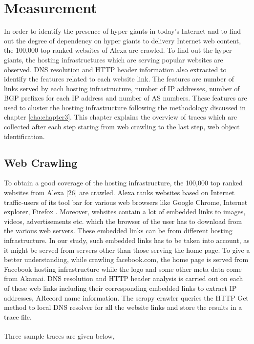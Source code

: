 \section{Measurement\label{cha:chapter5}}
\noindent In order to identify the presence of hyper giants in today's Internet and to find out the degree of dependency on hyper giants to delivery Internet web content, the 100,000 top ranked websites of Alexa are crawled. To find out the hyper giants, the hosting infrastructures which are serving popular websites are observed. DNS resolution and HTTP header information also extracted to identify the features related to each website link. The features are number of links served by each hosting infrastructure, number of IP addresses, number of BGP prefixes for each IP address and number of AS numbers. These features are used to cluster the hosting infrastructure following the methodology discussed in chapter \ref{cha:chapter3}. This chapter explains the overview of traces which are collected after each step staring from web crawling to the last step, web object identification.\\
\subsection{Web Crawling}
\noindent To obtain a good coverage of the hosting infrastructure, the 100,000 top ranked websites from Alexa [26] are crawled. Alexa ranks websites based on Internet traffic-users of its tool bar for various web browsers like Google Chrome, Internet explorer, Firefox . Moreover, websites contain a lot of embedded links to images, videos, advertisements etc. which the browser of the user has to download from the various web servers. These embedded links can be from different hosting infrastructure. In our study, such embedded links has to be taken into account, as it might be served from servers other than those serving the home page. To give a better understanding, while crawling facebook.com, the home page is served from Facebook hosting infrastructure while the logo and some other meta data come from Akamai. DNS resolution and HTTP header analysis is carried out on each of these web links including their corresponding embedded links to extract IP addresses, ARecord name information. The scrapy crawler queries the HTTP Get method to local DNS resolver for all the website links and store the results in a trace file.\\\\

\noindent Three sample traces are given below,\\

